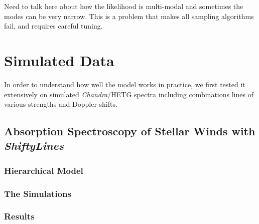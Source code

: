 \documentclass[12pt]{emulateapj}
\newcommand{\project}[1]{\textsl{#1}}
\newcommand{\chandra}{\project{Chandra}}
\begin{document}
Need to talk here about how the likelihood is multi-modal and sometimes the modes can be very narrow. 
This is a problem that makes all sampling algorithms fail, and requires careful tuning.


\section{Simulated Data}

In order to understand how well the model works in practice, we first tested it extensively on simulated \chandra/HETG spectra including combinations lines of various strengths and Doppler shifts. 

\subsection{Absorption Spectroscopy of Stellar Winds with \textit{ShiftyLines}}

\subsubsection{Hierarchical Model}

\subsubsection{The Simulations}


\subsubsection{Results}

\end{document}
